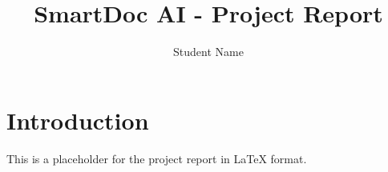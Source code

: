 \documentclass{article}
\begin{document}
\title{SmartDoc AI - Project Report}
\author{Student Name}
\maketitle
\section{Introduction}
This is a placeholder for the project report in LaTeX format.
\end{document}
